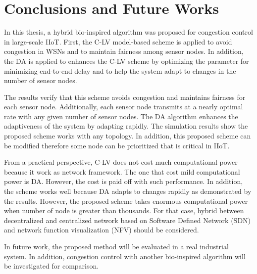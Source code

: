 \chapter{Conclusions and Future Works}



In this thesis, a hybrid bio-inspired algorithm was proposed for congestion control in large-scale IIoT. First, the C-LV model-based scheme is applied to avoid congestion in WSNs and to maintain fairness among sensor nodes. In addition, the DA is applied to enhances the C-LV scheme by optimizing the parameter for minimizing end-to-end delay and to help the system adapt to changes in the number of sensor nodes.

The results verify that this scheme avoids congestion and maintains fairness for each sensor node. Additionally, each sensor node transmits at a nearly optimal rate with any given number of sensor nodes. The DA algorithm enhances the adaptiveness of the system by adapting rapidly. The simulation results show the proposed scheme works with any topology. In addition, this proposed scheme can be modified therefore some node can be prioritized that is critical in IIoT. 

From a practical perspective, C-LV does not cost much computational power because it work as network framework. The one that cost mild computational power is DA. However, the cost is paid off with such performance. In addition, the scheme works well because DA adapts to changes rapidly as demonstrated by the results. However, the proposed scheme takes enormous computational power when number of node is greater than thousands. For that case, hybrid between decentralized and centralized network based on Software Defined Network (SDN) and network function visualization (NFV) should be considered.

In future work, the proposed method will be evaluated in a real industrial system. In addition, congestion control with another bio-inspired algorithm will be investigated for comparison. 